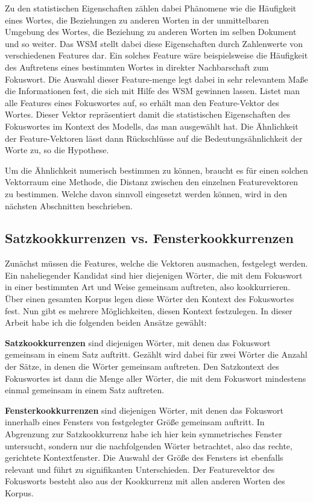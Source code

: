 \documentclass[11pt,numbers=noenddot]{scrartcl}
\begin{document}
Zu den statistischen Eigenschaften zählen dabei Phänomene wie die Häufigkeit eines Wortes, die Beziehungen zu anderen Worten in der unmittelbaren Umgebung des Wortes, die Beziehung zu anderen Worten im selben Dokument und so weiter. Das WSM stellt dabei diese Eigenschaften durch Zahlenwerte von verschiedenen Features dar. Ein solches Feature wäre beispielsweise die Häufigkeit des Auftretens eines bestimmten Wortes in direkter Nachbarschaft zum Fokuswort. Die Auswahl dieser Feature-menge legt dabei in sehr relevantem Maße die Informationen fest, die sich mit Hilfe des WSM gewinnen lassen. Listet man alle Features eines Fokuswortes auf, so erhält man den Feature-Vektor des Wortes. Dieser Vektor repräsentiert damit die statistischen Eigenschaften des Fokuswortes im Kontext des Modells, das man ausgewählt hat. Die Ähnlichkeit der Feature-Vektoren lässt dann Rückschlüsse auf die Bedeutungsähnlichkeit der Worte zu, so die Hypothese.

Um die Ähnlichkeit numerisch bestimmen zu können, braucht es für einen solchen Vektorraum eine Methode, die Distanz zwischen den einzelnen Featurevektoren zu bestimmen. Welche davon sinnvoll eingesetzt werden können, wird in den nächsten Abschnitten beschrieben.

\subsection{Satzkookkurrenzen vs. Fensterkookkurrenzen}

Zunächst müssen die Features, welche die Vektoren ausmachen, festgelegt werden. Ein naheliegender Kandidat sind hier diejenigen Wörter, die mit dem Fokuswort in einer bestimmten Art und Weise gemeinsam auftreten, also kookkurrieren. Über einen gesamten Korpus legen diese Wörter den Kontext des Fokuswortes fest. Nun gibt es mehrere Möglichkeiten, diesen Kontext festzulegen. In dieser Arbeit habe ich die folgenden beiden Ansätze gewählt:

\textbf{Satzkookkurrenzen} sind diejenigen Wörter, mit denen das Fokuswort gemeinsam in einem Satz auftritt. Gezählt wird dabei für zwei Wörter die Anzahl der Sätze, in denen die Wörter gemeinsam auftreten. Den Satzkontext des Fokuswortes ist dann die Menge aller Wörter, die mit dem Fokuswort mindestens einmal gemeinsam in einem Satz auftreten.

\textbf{Fensterkookkurrenzen} sind diejenigen Wörter, mit denen das Fokuswort innerhalb eines Fensters von festgelegter Größe gemeinsam auftritt. In Abgrenzung zur Satzkookkurrenz habe ich hier kein symmetrisches Fenster untersucht, sondern nur die nachfolgenden Wörter betrachtet, also das rechte, gerichtete Kontextfenster. Die Auswahl der Größe des Fensters ist ebenfalls relevant und führt zu signifikanten Unterschieden. Der Featurevektor des Fokusworts besteht also aus der Kookkurrenz mit allen anderen Worten des Korpus.
\end{document}
